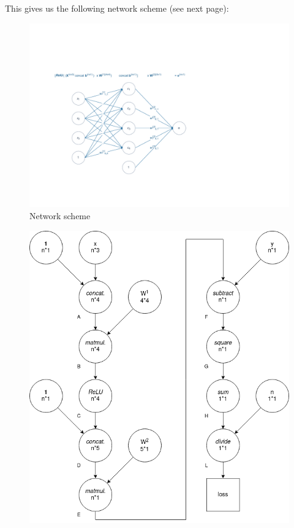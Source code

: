 \begin{exercise}
This gives us the following network scheme (see next page):
\begin{figure}
    \centering
    \includegraphics{img/Network_scheme.pdf}
    \caption{Network scheme}
    \label{fig:my_label}
\end{figure}
\end{exercise}
\pagebreak

\begin{exercise}

\begin{figure}[ht!]
    \centering
    \includegraphics[width=0.8\linewidth]{img/comp_graph.png}
\end{figure}

\end{exercise}

